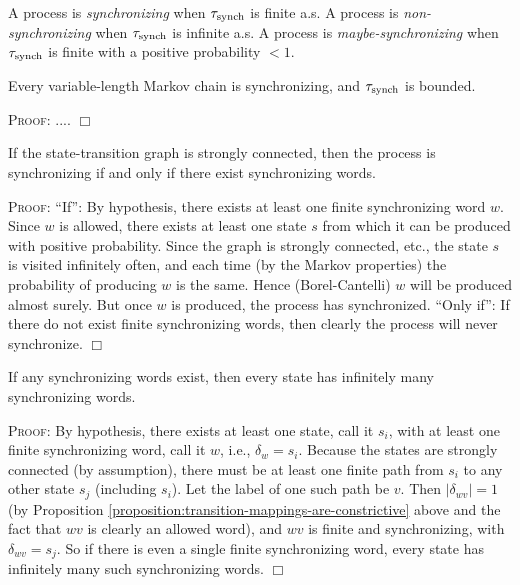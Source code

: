 \documentclass[../new-procedure.tex]{subfiles}
\begin{document}
\begin{definition}
  A process is {\em synchronizing} when $\tau_{\mathrm{synch}}$ is finite a.s.  A process
  is {\em non-synchronizing} when $\tau_{\mathrm{synch}}$ is infinite a.s.  A process is
  {\em maybe-synchronizing} when $\tau_{\mathrm{synch}}$ is finite with a positive
  probability $< 1$.
\end{definition}

\begin{proposition}
Every variable-length Markov chain is synchronizing, and $\tau_{\mathrm{synch}}$ is bounded.
\end{proposition}
\textsc{Proof}: .... $\Box$

\begin{proposition}
  If the state-transition graph is strongly connected, then the process is
  synchronizing if and only if there exist synchronizing words.
\end{proposition}

\textsc{Proof}: ``If'': By hypothesis, there exists at least one finite
synchronizing word $w$.  Since $w$ is allowed, there exists at least one state
$s$ from which it can be produced with positive probability.  Since the graph
is strongly connected, etc., the state $s$ is visited infinitely often, and
each time (by the Markov properties) the probability of producing $w$ is the
same.  Hence (Borel-Cantelli) $w$ will be produced almost surely.  But once $w$
is produced, the process has synchronized.  ``Only if'': If there do not exist
finite synchronizing words, then clearly the process will never
synchronize. $\Box$

\begin{proposition}
  If any synchronizing words exist, then every state has infinitely many
  synchronizing words.
\end{proposition}

\textsc{Proof}: By hypothesis, there exists at least one state, call it $s_i$,
with at least one finite synchronizing word, call it $w$, i.e., $\delta_w =
s_i$.  Because the states are strongly connected (by assumption), there must be
at least one finite path from $s_i$ to any other state $s_j$ (including $s_i$).
Let the label of one such path be $v$.  Then $|\delta_{wv}| = 1$ (by
Proposition \ref{proposition:transition-mappings-are-constrictive} above and
the fact that $wv$ is clearly an allowed word), and $wv$ is finite and
synchronizing, with $\delta_{wv} = s_j$.  So if there is even a single finite
synchronizing word, every state has infinitely many such synchronizing
words. $\Box$
\end{document}
